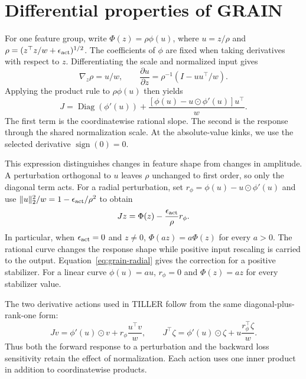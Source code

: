 \section{Differential properties of GRAIN}
\label{sec:grain}
\label{app:grain-calculus}

For one feature group, write $\Phi(z)=\rho\phi(u)$, where
$u=z/\rho$ and $\rho=(z^\top z/w+\epsilon_{\rm act})^{1/2}$.
The coefficients of $\phi$ are fixed when taking derivatives with
respect to $z$. Differentiating the scale and normalized input gives
\begin{equation}
 \nabla_z\rho=u/w,\qquad
 \frac{\partial u}{\partial z}=\rho^{-1}(I-uu^\top/w).
\end{equation}
Applying the product rule to $\rho\phi(u)$ then yields
\begin{equation}
 J=\operatorname{Diag}(\phi'(u))+
 \frac{[\phi(u)-u\odot\phi'(u)]u^\top}{w}.
 \label{eq:grain-jacobian}
\end{equation}
The first term is the coordinatewise rational slope. The second is
the response through the shared normalization scale. At the
absolute-value kinks, we use the selected derivative
$\operatorname{sign}(0)=0$.

This expression distinguishes changes in feature shape from changes
in amplitude. A perturbation orthogonal to $u$ leaves $\rho$ unchanged
to first order, so only the diagonal term acts. For a radial
perturbation, set $r_\phi=\phi(u)-u\odot\phi'(u)$ and use
$\|u\|_2^2/w=1-\epsilon_{\rm act}/\rho^2$ to obtain
\begin{equation}
 Jz=\Phi(z)-\frac{\epsilon_{\rm act}}{\rho}r_\phi.
 \label{eq:grain-radial}
\end{equation}
In particular, when $\epsilon_{\rm act}=0$ and $z\ne0$,
$\Phi(az)=a\Phi(z)$ for every $a>0$. The rational curve changes
the response shape while positive input rescaling is carried to
the output. Equation~\ref{eq:grain-radial} gives the correction for
a positive stabilizer. For a linear curve $\phi(u)=au$, $r_\phi=0$
and $\Phi(z)=az$ for every stabilizer value.

The two derivative actions used in TILLER follow from the same
diagonal-plus-rank-one form:
\begin{equation}
 Jv=\phi'(u)\odot v+r_\phi\frac{u^\top v}{w},\qquad
 J^\top\zeta=\phi'(u)\odot\zeta+
 u\frac{r_\phi^\top\zeta}{w}.
 \label{eq:grain-jacobian-actions}
\end{equation}
Thus both the forward response to a perturbation and the backward
loss sensitivity retain the effect of normalization. Each action
uses one inner product in addition to coordinatewise products.

